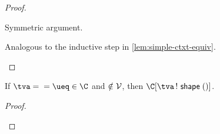 \documentclass[acmsmall,screen,nonacm,review]{acmart}
\begin{document}
\begin{lemma}
\begin{proof}
\begin{proofcases}
\begin{proofcases}
	\begin{llproof}
	  \vdashPf{\semenv\where{\x \is \semenv(\cabsr \tv \tvs \C\where{\cs})}}{\Cp\where{\ca}}{\ditto}
	  \vdashPf{\semenv\where{\x \is \semenv(\cabsr \tv \tvs \C\where{\cs})}}{\Cp\where{\cb}}{$\ddagger$}
	\end{llproof}
	  \proofcase{$\impliedby$}

	  \begin{llproof}
	    Symmetric argument.
	  \end{llproof}
	\end{proofcases}


      \begin{llproof}
	Analogous to the inductive step in \cref{lem:simple-ctxt-equiv}.
      \end{llproof}
    \end{proofcases}
  \end{proof}
\end{lemma}

\newcommand{\disjointPf}[3]{\Pf{#1}{\disjoint}{#2}{#3}}
\begin{lemma}
  \label{lem:unicity-match-var}
  If $\cunif \tv {\cunif \t \ueq} \in \C$ and $\relax \notin \mathcal{V}$, then
  $\Cshape \C \tv {~\shape \t}$.
  \begin{proof}~

    \begin{llproof}
      \disjointPf{\fvs {\tv, \t, \ueq}}{\bvs \Cb}{\ditto}
      \continueeqPf{\semenva(\tv)}{$\tv \disjoint \bvs \Cb$}
\Hand {}
    \end{llproof}
  \end{proof}
\end{lemma}
\end{document}
